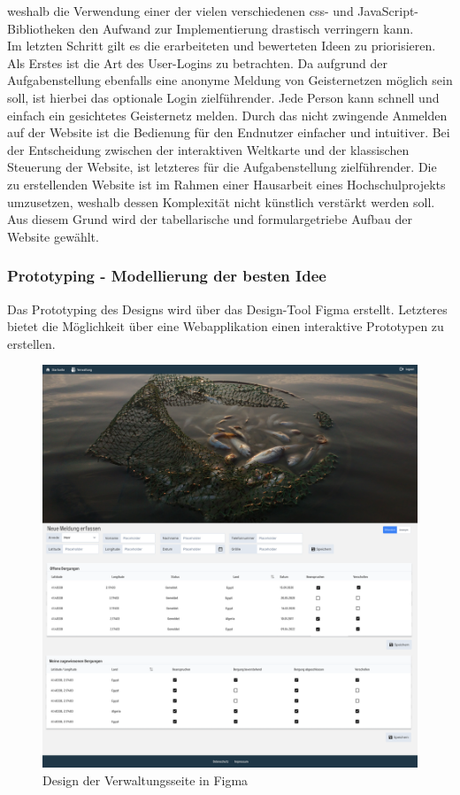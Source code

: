 \documentclass[11pt]{article}
\begin{document}
    weshalb die Verwendung einer der vielen verschiedenen \gls{css}- und JavaScript-Bibliotheken den Aufwand zur Implementierung drastisch verringern kann.
    \\
    Im letzten Schritt gilt es die erarbeiteten und bewerteten Ideen zu priorisieren.
    Als Erstes ist die Art des User-Logins zu betrachten. Da aufgrund der Aufgabenstellung
    ebenfalls eine anonyme Meldung von Geisternetzen möglich sein soll, ist hierbei das optionale Login zielführender.
    Jede Person kann schnell und einfach ein gesichtetes Geisternetz melden. Durch das nicht zwingende
    Anmelden auf der Website ist die Bedienung für den Endnutzer einfacher und intuitiver.
    Bei der Entscheidung zwischen der interaktiven Weltkarte und der klassischen Steuerung der Website, ist letzteres für die Aufgabenstellung zielführender.
    Die zu erstellenden Website ist im Rahmen einer Hausarbeit eines Hochschulprojekts umzusetzen,
    weshalb dessen Komplexität nicht künstlich verstärkt werden soll. Aus diesem Grund wird der tabellarische und formulargetriebe Aufbau der Website gewählt.
    
    \newpage
    \subsubsection{Prototyping - Modellierung der besten Idee}
    Das Prototyping des Designs wird über das Design-Tool Figma erstellt. Letzteres bietet die Möglichkeit
    über eine Webapplikation einen interaktive Prototypen zu erstellen.
    \begin{figure}[H]
        \centering
        \includegraphics[width=\textwidth]{abbildungen/Verwaltungsseite.png}
        \caption{Design der Verwaltungsseite in Figma}
        \label{verwaltung-figma}
    \end{figure}
\end{document}
